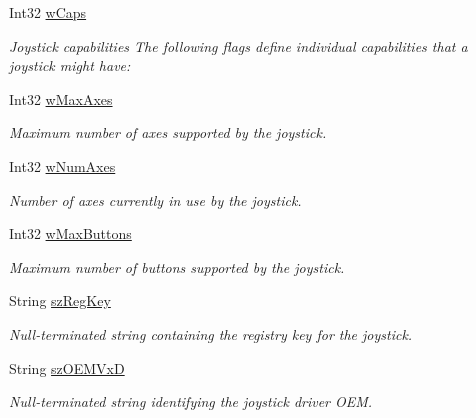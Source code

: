 \begin{DoxyCompactItemize}
Int32 \hyperlink{struct_tao_1_1_platform_1_1_windows_1_1_winmm_1_1_j_o_y_c_a_p_s_a52448bee08348ae1de8cf5a8b03cd9b1}{wCaps}
\begin{DoxyCompactList}\small\item\em Joystick capabilities The following flags define individual capabilities that a joystick might have: \item\end{DoxyCompactList}\item 
Int32 \hyperlink{struct_tao_1_1_platform_1_1_windows_1_1_winmm_1_1_j_o_y_c_a_p_s_a74f7c8327a0f988667bc71000264aca4}{wMaxAxes}
\begin{DoxyCompactList}\small\item\em Maximum number of axes supported by the joystick. \item\end{DoxyCompactList}\item 
Int32 \hyperlink{struct_tao_1_1_platform_1_1_windows_1_1_winmm_1_1_j_o_y_c_a_p_s_a8fe9520e766214bebfc4874805620afc}{wNumAxes}
\begin{DoxyCompactList}\small\item\em Number of axes currently in use by the joystick. \item\end{DoxyCompactList}\item 
Int32 \hyperlink{struct_tao_1_1_platform_1_1_windows_1_1_winmm_1_1_j_o_y_c_a_p_s_a012f8f0a0a5538d82b71a53f158f0f47}{wMaxButtons}
\begin{DoxyCompactList}\small\item\em Maximum number of buttons supported by the joystick. \item\end{DoxyCompactList}\item 
String \hyperlink{struct_tao_1_1_platform_1_1_windows_1_1_winmm_1_1_j_o_y_c_a_p_s_a0390a90623660ad4080990d2b8f7791b}{szRegKey}
\begin{DoxyCompactList}\small\item\em Null-\/terminated string containing the registry key for the joystick. \item\end{DoxyCompactList}\item 
String \hyperlink{struct_tao_1_1_platform_1_1_windows_1_1_winmm_1_1_j_o_y_c_a_p_s_a9a106677ae4b32a847733daa6d849789}{szOEMVxD}
\begin{DoxyCompactList}\small\item\em Null-\/terminated string identifying the joystick driver OEM. \item\end{DoxyCompactList}\end{DoxyCompactItemize}


